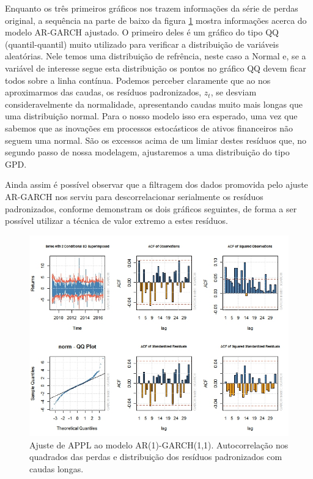 \documentclass[review]{elsarticle}
\theoremstyle{definition}
\begin{document}
Enquanto os três primeiros gráficos nos trazem informações da série de perdas original, a sequência na parte de baixo da figura \ref{fig:figevtAAPL} mostra informações acerca do modelo AR-GARCH ajustado. O primeiro deles é um gráfico do tipo QQ (quantil-quantil) muito utilizado para verificar a distribuição de variáveis aleatórias. Nele temos uma distribuição de refrência, neste caso a Normal e, se a variável de interesse segue esta distribuição os pontos no gráfico QQ devem ficar todos sobre a linha contínua. Podemos perceber claramente que ao nos aproximarmos das caudas, os resíduos padronizados, $z_t$, se desviam consideravelmente da normalidade, apresentando caudas muito mais longas que uma distribuição normal. Para o nosso modelo isso era esperado, uma vez que sabemos que as inovações em processos estocásticos de ativos financeiros não seguem uma normal. São os excessos acima de um limiar destes resíduos que, no segundo passo de nossa modelagem, ajustaremos a uma distribuição do tipo GPD.

Ainda assim é possível observar que a filtragem dos dados promovida pelo ajuste AR-GARCH nos serviu para descorrelacionar serialmente os resíduos padronizados, conforme demonstram os dois gráficos seguintes, de forma a ser possível utilizar a técnica de valor extremo a estes resíduos.

\begin{figure}[h]
	\centering
	\includegraphics[width=0.9\linewidth]{figs/figevtAAPL}
	\caption[Modelo AR-GARCH de Apple Inc.]{Ajuste de APPL ao modelo AR(1)-GARCH(1,1). Autocorrelação nos quadrados das perdas e distribuição dos resíduos padronizados com caudas longas.}
	\label{fig:figevtAAPL}
\end{figure}
\end{document}
